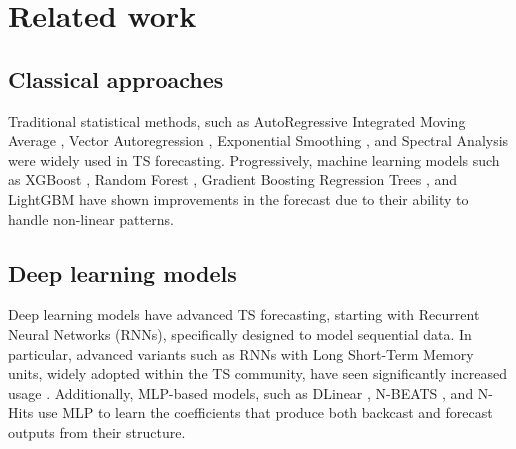 \section{Related work}
\label{sec:related_work}

\subsection{Classical approaches}
Traditional statistical methods, such as AutoRegressive Integrated Moving Average \cite{BoxPierce1970}, Vector Autoregression \cite{toda1993}, Exponential Smoothing \cite{hyndman2008forecasting}, and Spectral Analysis \cite{koopmans1995spectral} were widely used in TS forecasting. 
Progressively, machine learning models such as XGBoost \cite{chen2016xgboost}, Random Forest \cite{breiman2001random}, Gradient Boosting Regression Trees \cite{friedman2001greedy}, and LightGBM \cite{ke2017lightgbm} have shown improvements in the forecast due to their ability to handle non-linear patterns.

\subsection{Deep learning models}

Deep learning models have advanced TS forecasting, starting with Recurrent Neural Networks (RNNs), specifically designed to model sequential data.
In particular, advanced variants such as RNNs with Long Short-Term Memory units, widely adopted within the TS community, have seen significantly increased usage \cite{hochreiter1997long}.
Additionally, MLP-based models, such as DLinear \cite{zeng_are_2022}, N-BEATS \cite{Oreshkin2020}, and N-Hits \cite{challu2023nhits} use MLP to learn the coefficients that produce both backcast and forecast outputs from their structure.


